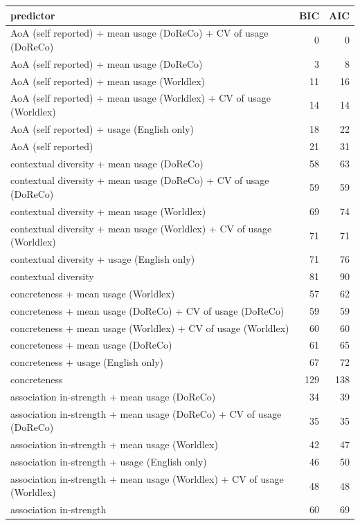 \begin{table}[ht]
\centering
\begin{tabular}{lrr}
  \hline
predictor & BIC & AIC \\ 
  \hline
AoA (self reported) + mean usage (DoReCo) + CV of usage (DoReCo) & 0 & 0 \\ 
  AoA (self reported) + mean usage (DoReCo) & 3 & 8 \\ 
  AoA (self reported) + mean usage (Worldlex) & 11 & 16 \\ 
  AoA (self reported) + mean usage (Worldlex) + CV of usage (Worldlex) & 14 & 14 \\ 
  AoA (self reported) + usage (English only) & 18 & 22 \\ 
  AoA (self reported) & 21 & 31 \\ 
  contextual diversity + mean usage (DoReCo) & 58 & 63 \\ 
  contextual diversity + mean usage (DoReCo) + CV of usage (DoReCo) & 59 & 59 \\ 
  contextual diversity + mean usage (Worldlex) & 69 & 74 \\ 
  contextual diversity + mean usage (Worldlex) + CV of usage (Worldlex) & 71 & 71 \\ 
  contextual diversity + usage (English only) & 71 & 76 \\ 
  contextual diversity & 81 & 90 \\ 
  concreteness + mean usage (Worldlex) & 57 & 62 \\ 
  concreteness + mean usage (DoReCo) + CV of usage (DoReCo) & 59 & 59 \\ 
  concreteness + mean usage (Worldlex) + CV of usage (Worldlex) & 60 & 60 \\ 
  concreteness + mean usage (DoReCo) & 61 & 65 \\ 
  concreteness + usage (English only) & 67 & 72 \\ 
  concreteness & 129 & 138 \\ 
  association in-strength + mean usage (DoReCo) & 34 & 39 \\ 
  association in-strength + mean usage (DoReCo) + CV of usage (DoReCo) & 35 & 35 \\ 
  association in-strength + mean usage (Worldlex) & 42 & 47 \\ 
  association in-strength + usage (English only) & 46 & 50 \\ 
  association in-strength + mean usage (Worldlex) + CV of usage (Worldlex) & 48 & 48 \\ 
  association in-strength & 60 & 69 \\ 

\end{tabular}
\end{table}
